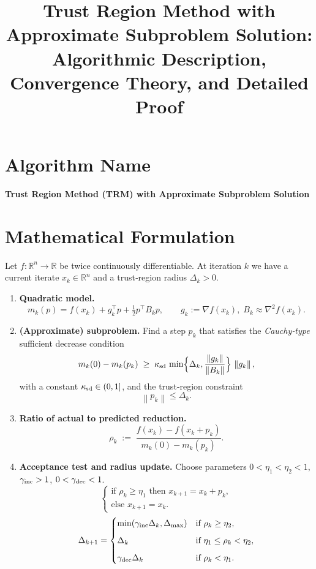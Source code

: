 \documentclass[11pt]{article}
\newcommand{\R}{\mathbb{R}}
\newcommand{\norm}[1]{\left\lVert#1\right\rVert}
\begin{document}
\title{Trust Region Method with Approximate Subproblem Solution:\\Algorithmic Description, Convergence Theory, and Detailed Proof}
\author{}
\date{}
\maketitle

\section*{Algorithm Name}
\textbf{Trust Region Method (TRM) with Approximate Subproblem Solution}
\section*{Mathematical Formulation}
Let $f:\R^{n}\rightarrow\R$ be twice continuously differentiable.  
At iteration $k$ we have a current iterate $x_{k}\in\R^{n}$ and a trust‑region radius $\Delta_{k}>0$.

\begin{enumerate}[label=\arabic*.]
\item \textbf{Quadratic model.}
\[
m_{k}(p)=f(x_{k})+g_{k}^{\top}p+\tfrac12 p^{\top}B_{k}p,
\qquad 
g_{k}:=\nabla f(x_{k}),\; B_{k}\approx\nabla^{2}f(x_{k}).
\]

\item \textbf{(Approximate) subproblem.}
Find a step $p_{k}$ that satisfies the \emph{Cauchy‑type} sufficient decrease condition
\begin{equation}
\label{eq:suffdec}
m_{k}(0)-m_{k}(p_{k})\;\ge\;\kappa_{\rm sd}\,\min\!\Big\{\Delta_{k},\frac{\norm{g_{k}}}{\norm{B_{k}}}\Big\}\,\norm{g_{k}},
\end{equation}
with a constant $\kappa_{\rm sd}\in(0,1]$, and the trust‑region constraint
\[
\norm{p_{k}}\le\Delta_{k}.
\]

\item \textbf{Ratio of actual to predicted reduction.}
\[
\rho_{k}\;:=\;
\frac{f(x_{k})-f(x_{k}+p_{k})}{m_{k}(0)-m_{k}(p_{k})}.
\]

\item \textbf{Acceptance test and radius update.}
Choose parameters $0<\eta_{1}<\eta_{2}<1$, $\gamma_{\rm inc}>1$, $0<\gamma_{\rm dec}<1$.
\[
\begin{cases}
\text{if }\rho_{k}\ge\eta_{1}\text{ then }x_{k+1}=x_{k}+p_{k},\\[2mm]
\text{else }x_{k+1}=x_{k}.
\end{cases}
\]
\[
\Delta_{k+1}= 
\begin{cases}
\min(\gamma_{\rm inc}\Delta_{k},\Delta_{\max}) & \text{if }\rho_{k}\ge\eta_{2},\\[2mm]
\Delta_{k}                                 & \text{if }\eta_{1}\le\rho_{k}<\eta_{2},\\[2mm]
\gamma_{\rm dec}\Delta_{k}                 & \text{if }\rho_{k}<\eta_{1}.
\end{cases}
\]
\end{enumerate}
\end{document}
